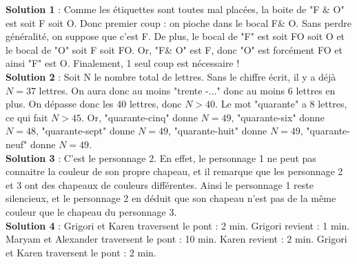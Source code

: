 \documentclass{article}
\begin{document}
\newpage  



\textbf{Solution 1 } : Comme les  étiquettes sont toutes mal placées, la boite de "F \& O" est soit F soit O. Donc premier coup : on pioche dans le bocal F\& O. Sans perdre généralité, on suppose que c’est F. De plus, le bocal de "F" est soit FO soit O et le bocal de "O" soit F soit FO. Or, "F\& O" est F, donc "O" est forcément FO et ainsi "F" est O. Finalement, 1 seul coup est nécessaire ! \\




\textbf{Solution 2} : Soit N le nombre total de lettres. Sans le chiffre  écrit, il y a déjà $N = 37$ lettres. On aura donc au moins "trente -..." donc au moins 6 lettres en plus. On dépasse donc les 40 lettres, donc $N > 40$. Le mot "quarante" a 8 lettres, ce qui fait $N > 45$. Or, "quarante-cinq" donne $N = 49$, "quarante-six" donne $N = 48$, "quarante-sept" donne $N = 49$, "quarante-huit" donne $N = 49$, "quarante-neuf" donne $N = 49$. \\

\textbf{Solution 3 } : C'est le personnage 2. En effet, le personnage 1 ne peut pas connaitre la couleur de son propre chapeau, et il remarque que les personnage 2 et 3 ont des chapeaux de couleurs différentes. Ainsi le personnage 1 reste silencieux, et le personnage 2 en déduit que son chapeau n'est pas de la même couleur que le chapeau du personnage 3. \\

\textbf{Solution 4} : Grigori et Karen traversent le pont : 2 min. Grigori revient : 1 min. Maryam et Alexander traversent le pont : 10 min. Karen revient : 2 min. Grigori et Karen traversent le pont : 2 min. \\



%
%
%
 
\end{document}
